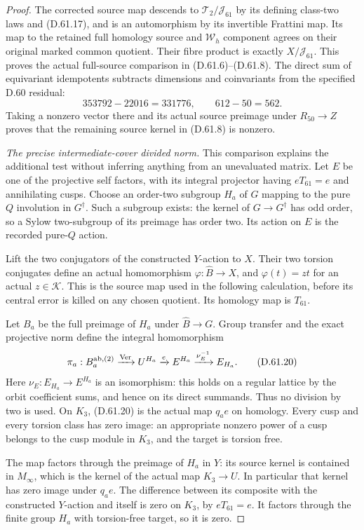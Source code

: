 \begin{proof}
The corrected source map descends
to \(\mathcal T_2/\mathcal J_{61}\)
by its defining class-two laws
and (D.61.17), and is an
automorphism by its invertible
Frattini map. Its map to the
retained full homology source
and \(\mathcal W_h\) component
agrees on their original marked
common quotient. Their fibre
product is exactly
\(X/\mathcal J_{61}\).
This proves the actual full-source
comparison in (D.61.6)--(D.61.8).
The direct sum of equivariant
idempotents subtracts dimensions
and coinvariants from the
specified D.60 residual:
\[
                     353792-22016=331776,
               \qquad 612-50=562.
 \tag{D.61.19}
\]
Taking a nonzero vector there
and its actual source preimage
under \(R_{50}\to Z\) proves
that the remaining source
kernel in (D.61.8) is nonzero.

\emph{The precise intermediate-cover divided norm.}
This comparison explains the
additional test without inferring
anything from an unevaluated
matrix. Let \(E\) be one of
the projective self factors,
with its integral projector
having \(eT_{61}=e\) and
annihilating cusps. Choose an
order-two subgroup \(H_a\)
of \(G\) mapping to the pure
\(Q\) involution in \(G^\dagger\).
Such a subgroup exists: the
kernel of \(G\to G^\dagger\)
has odd order, so a Sylow
two-subgroup of its preimage
has order two. Its action
on \(E\) is the recorded
pure-\(Q\) action.

Lift the two conjugators of the constructed
\(Y\)-action to \(X\). Their two torsion
conjugates define an actual homomorphism
\(\varphi:\widehat B\to X\), and
\(\varphi(t)=zt\) for an actual \(z\in\mathcal K\).
This is the source map used in the following
calculation, before its central error is killed
on any chosen quotient. Its homology map is
\(T_{61}\).

Let \(B_a\) be the full preimage
of \(H_a\) under \(\widehat B\to G\).
Group transfer and the exact
projective norm define the
integral homomorphism
\[
 \pi_a:B_a^{\rm ab,(2)}
   \xrightarrow{\operatorname{Ver}}U^{H_a}
   \xrightarrow{e}E^{H_a}
   \xrightarrow{\nu_E^{-1}}E_{H_a}.
 \tag{D.61.20}
\]
Here \(\nu_E:E_{H_a}\to E^{H_a}\)
is an isomorphism: this holds
on a regular lattice by the
orbit coefficient sums, and
hence on its direct summands.
Thus no division by two is
used. On \(K_3\), (D.61.20)
is the actual map \(q_ae\)
on homology. Every cusp and
every torsion class has zero
image: an appropriate nonzero
power of a cusp belongs to
the cusp module in \(K_3\),
and the target is torsion free.

The map factors through the
preimage of \(H_a\) in \(Y\): its source
kernel is contained in \(M_\infty\),
which is the kernel of the actual map
\(K_3\to U\). In particular that kernel
has zero image under \(q_ae\).
The difference between its
composite with the constructed
\(Y\)-action and itself is
zero on \(K_3\), by
\(eT_{61}=e\). It factors
through the finite group
\(H_a\) with torsion-free
target, so it is zero.


\end{proof}
